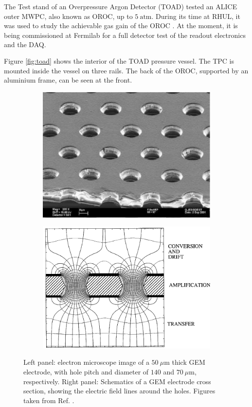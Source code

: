 The Test stand of an Overpressure Argon Detector (TOAD) tested an ALICE outer MWPC, also known as OROC, up to $5~\mathrm{atm}$. During its time at RHUL, it was used to study the achievable gas gain of the OROC \cite{Ritchie-Yates2023}. At the moment, it is being commissioned at Fermilab for a full detector test of the readout electronics and the DAQ.

Figure \ref{fig:toad} shows the interior of the TOAD pressure vessel. The TPC is mounted inside the vessel on three rails. The back of the OROC, supported by an aluminium frame, can be seen at the front.

\begin{figure}[h!]
	\begin{subfigure}{0.49\textwidth}
		\centering
		\includegraphics[width=.90\linewidth]{Images/ND-GAr/GEM_photo.jpg}
	\end{subfigure}
	\begin{subfigure}{0.49\textwidth}
		\centering
		\includegraphics[width=.90\linewidth]{Images//ND-GAr/GEM_diagram.pdf}
	\end{subfigure}
	\caption[Electron microscope image and schematic diagram of a GEM electrode.]{Left panel: electron microscope image of a $50~\mu\mathrm{m}$ thick GEM electrode, with hole pitch and diameter of $140$ and $70~\mu\mathrm{m}$, respectively. Right panel: Schematics of a GEM electrode cross section, showing the electric field lines around the holes. Figures taken from Ref. \cite{Sauli2016}.}
	\label{fig:gem}
\end{figure}

